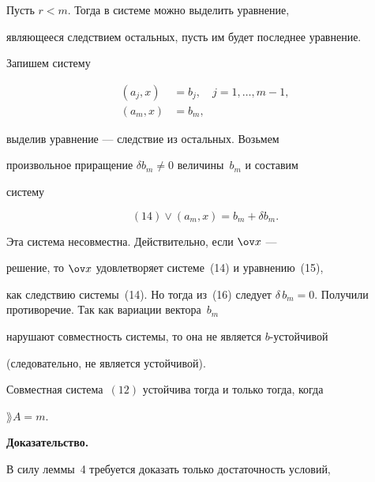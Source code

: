 \begin{pf}


Пусть $r<m$. Тогда в системе можно выделить уравнение,


являющееся следствием остальных, пусть им будет последнее уравнение.


Запишем систему


\begin{align}


(a_j,x)&=b_j,\quad j=1,\dotsc,m-1,\\


(a_m,x)&=b_m,


\end{align}


выделив уравнение --- следствие из остальных. Возьмем


произвольное приращение $\delta b_m\neq 0$ величины~$b_m$ и составим


систему


\begin{equation}


(14)\lor (a_m,x)=b_m+\delta b_m.


\end{equation}


Эта система несовместна. Действительно, если $\ov x$ ---


решение, то $\ov x$ удовлетворяет системе~(14) и уравнению~(15),


как следствию системы~(14). Но тогда из~(16) следует $\delta\,


b_m=0$. Получили противоречие. Так как вариации вектора~$b_m$


нарушают совместность системы, то она не является $b$-устойчивой


(следовательно, не является устойчивой).


\end{pf}





\begin{cor}


Совместная система~$(12)$ устойчива тогда и только тогда, когда


$\rang A=m$.


\end{cor}





{\bf Доказательство.}


В силу леммы~4 требуется доказать только достаточность условий,


